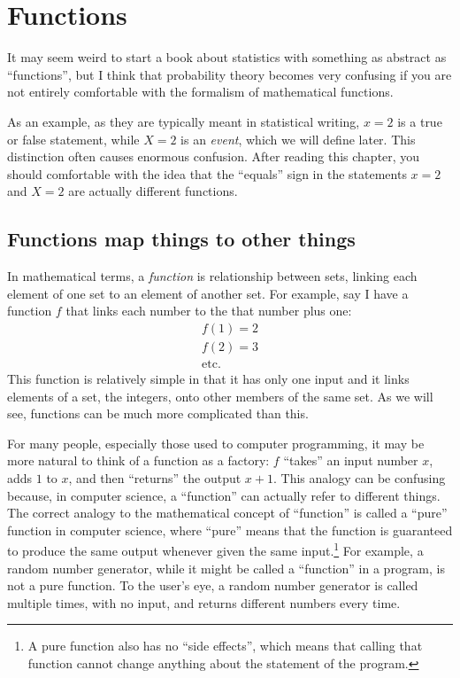 
\chapter{Functions}
\label{chapter:functions}

It may seem weird to start a book about statistics with something as abstract
as ``functions'', but I think that probability theory becomes very confusing if you
are not entirely comfortable with the formalism of mathematical functions.

As an example, as they are typically meant in statistical writing, $x=2$ is a
true or false statement, while $X=2$ is an \emph{event}, which we will define
later. This distinction often causes enormous confusion. After reading this
chapter, you should comfortable with the idea that the ``equals'' sign in the
statements $x=2$ and $X=2$ are actually different functions.

\section{Functions map things to other things}

In mathematical terms, a \emph{function} is relationship between sets, linking
each element of one set to an element of another set. For example, say I have a
function $f$ that links each number to the that number plus one:
\begin{gather*}
f(1) = 2 \\
f(2) = 3 \\
\text{etc.}
\end{gather*}
This function is relatively simple in that it has only one input and it links
elements of a set, the integers, onto other members of the same set. As we will
see, functions can be much more complicated than this.

For many people, especially those used to computer programming, it may be more
natural to think of a function as a factory: $f$ ``takes'' an input number $x$,
adds $1$ to $x$, and then ``returns'' the output $x+1$. This analogy can be
confusing because, in computer science, a ``function'' can actually refer to
different things. The correct analogy to the mathematical concept of
``function'' is called a ``pure'' function in computer science, where ``pure''
means that the function is guaranteed to produce the same output whenever given
the same input.\footnote{A pure function also has no ``side effects'', which
means that calling that function cannot change anything about the statement of
the program.} For example, a random number generator, while it might be called
a ``function'' in a program, is not a pure function. To the user's eye, a
random number generator is called multiple times, with no input, and returns
different numbers every time.

